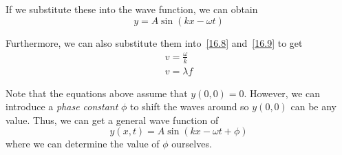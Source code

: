 If we substitute these into the wave function, we can obtain
\begin{equation}\label{16.10}
    y = A\sin(kx - \omega t)
\end{equation}

Furthermore, we can also substitute them into~\eqref{16.8} and~\eqref{16.9} to get
\begin{eqnarray}
    v = \frac{\omega}{k}\label{16.11}\\
    v = \lambda f\label{16.12}
\end{eqnarray}

Note that the equations above assume that $y(0, 0) = 0$. However, we can introduce a \textit{phase
constant} $\phi$ to shift the waves around so $y(0, 0)$ can be any value. Thus, we can get a general
wave function of
\begin{equation}\label{16.13}
    y(x, t) = A\sin(kx - \omega t + \phi)
\end{equation}
where we can determine the value of $\phi$ ourselves.